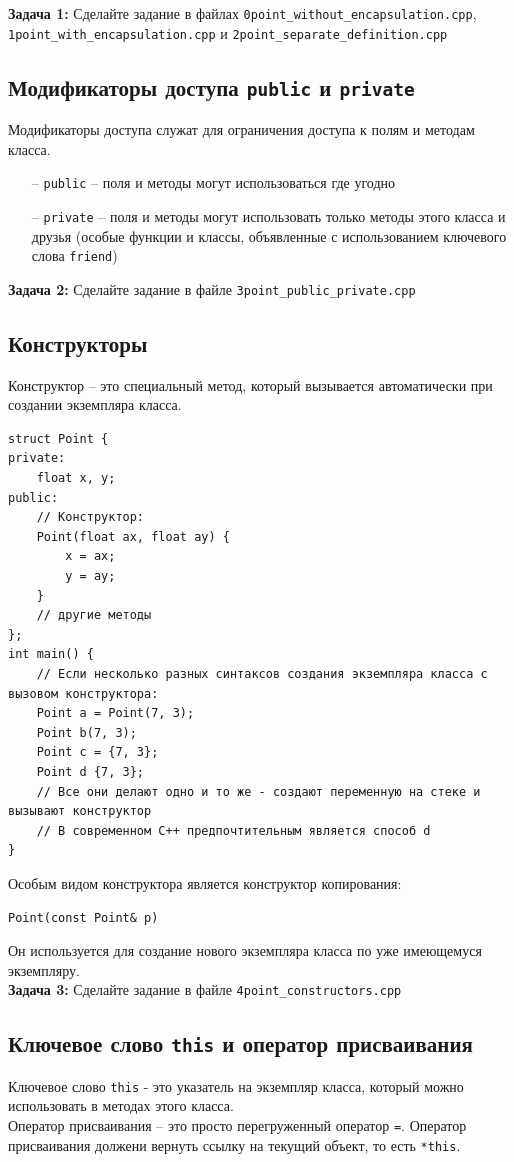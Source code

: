 \documentclass{article}
\begin{document}
\textbf{Задача 1:} Сделайте задание в файлах \texttt{0point\_without\_encapsulation.cpp}, \texttt{1point\_with\_encapsulation.cpp} и 
\texttt{2point\_separate\_definition.cpp}

\newpage

\subsection*{Модификаторы доступа \texttt{public} и \texttt{private}}
Модификаторы доступа служат для ограничения доступа к полям и методам класса.
\begin{itemize}
\item[--] \texttt{public} -- поля и методы могут использоваться где угодно
\item[--] \texttt{private} -- поля и методы могут использовать только методы этого класса и друзья (особые функции и классы, объявленные с использованием ключевого слова \texttt{friend})
\end{itemize}
\textbf{Задача 2:} Сделайте задание в файле \texttt{3point\_public\_private.cpp}
\subsection*{Конструкторы}
Конструктор -- это специальный метод, который вызывается автоматически при создании экземпляра класса.
\begin{lstlisting}
struct Point {
private:
	float x, y;
public:
	// Конструктор:
	Point(float ax, float ay) {
		x = ax;
		y = ay;
	}
	// другие методы
};
int main() {
	// Если несколько разных синтаксов создания экземпляра класса с вызовом конструктора:
	Point a = Point(7, 3);
	Point b(7, 3);
	Point c = {7, 3};
	Point d {7, 3};
	// Все они делают одно и то же - создают переменную на стеке и вызывают конструктор
	// В современном C++ предпочтительным является способ d
}
\end{lstlisting}
Особым видом конструктора является конструктор копирования:
\begin{lstlisting}
Point(const Point& p)
\end{lstlisting}
Он используется для создание нового экземпляра класса по уже имеющемуся экземпляру.\\
\textbf{Задача 3:} Сделайте задание в файле \texttt{4point\_constructors.cpp}

\subsection*{Ключевое слово \texttt{this} и оператор присваивания}
Ключевое слово \texttt{this} - это указатель на экземпляр класса, который можно использовать в методах этого класса.\\
Оператор присваивания -- это просто перегруженный оператор \texttt{=}. Оператор присваивания должени вернуть ссылку на текущий объект, то есть \texttt{*this}.\\
\end{document}
